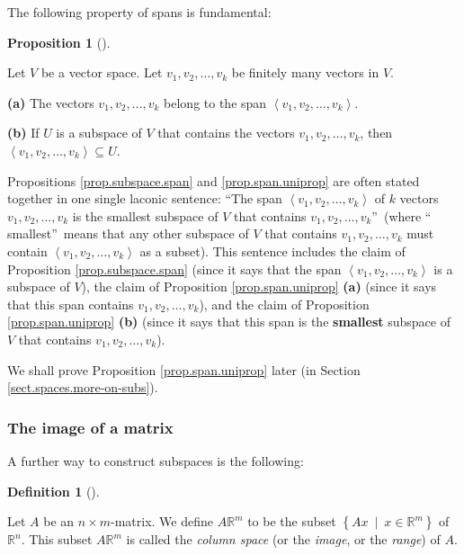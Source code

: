 \documentclass[numbers=enddot,12pt,final,onecolumn,notitlepage]{scrartcl}%
\theoremstyle{definition}
\newtheorem{prop}[theo]{Proposition}
\newenvironment{proposition}[1][]
{\begin{prop}[#1]\begin{leftbar}}
{\end{leftbar}\end{prop}}
\newtheorem{defi}[theo]{Definition}
\newenvironment{definition}[1][]
{\begin{defi}[#1]\begin{leftbar}}
{\end{leftbar}\end{defi}}
\begin{document}
The following property of spans is fundamental:

\begin{proposition}
\label{prop.span.uniprop}Let $V$ be a vector space. Let $v_{1},v_{2}%
,\ldots,v_{k}$ be finitely many vectors in $V$.

\textbf{(a)} The vectors $v_{1},v_{2},\ldots,v_{k}$ belong to the span
$\left\langle v_{1},v_{2},\ldots,v_{k}\right\rangle $.

\textbf{(b)} If $U$ is a subspace of $V$ that contains the vectors
$v_{1},v_{2},\ldots,v_{k}$, then $\left\langle v_{1},v_{2},\ldots
,v_{k}\right\rangle \subseteq U$.
\end{proposition}

Propositions \ref{prop.subspace.span} and \ref{prop.span.uniprop} are often
stated together in one single laconic sentence: \textquotedblleft The span
$\left\langle v_{1},v_{2},\ldots,v_{k}\right\rangle $ of $k$ vectors
$v_{1},v_{2},\ldots,v_{k}$ is the smallest subspace of $V$ that contains
$v_{1},v_{2},\ldots,v_{k}$\textquotedblright\ (where \textquotedblleft
smallest\textquotedblright\ means that any other subspace of $V$ that contains
$v_{1},v_{2},\ldots,v_{k}$ must contain $\left\langle v_{1},v_{2},\ldots
,v_{k}\right\rangle $ as a subset). This sentence includes the claim of
Proposition \ref{prop.subspace.span} (since it says that the span
$\left\langle v_{1},v_{2},\ldots,v_{k}\right\rangle $ is a subspace of $V$),
the claim of Proposition \ref{prop.span.uniprop} \textbf{(a)} (since it says
that this span contains $v_{1},v_{2},\ldots,v_{k}$), and the claim of
Proposition \ref{prop.span.uniprop} \textbf{(b)} (since it says that this span
is the \textbf{smallest} subspace of $V$ that contains $v_{1},v_{2}%
,\ldots,v_{k}$).

We shall prove Proposition \ref{prop.span.uniprop} later (in Section
\ref{sect.spaces.more-on-subs}).

\subsubsection{The image of a matrix}

A further way to construct subspaces is the following:

\begin{definition}
\label{def.subspace.Im}Let $A$ be an $n\times m$-matrix. We define
$A\mathbb{R}^{m}$ to be the subset $\left\{  Ax\ \mid\ x\in\mathbb{R}%
^{m}\right\}  $ of $\mathbb{R}^{n}$. This subset $A\mathbb{R}^{m}$ is called
the \textit{column space} (or the \textit{image}, or the \textit{range}) of
$A$.
\end{definition}
\end{document}

